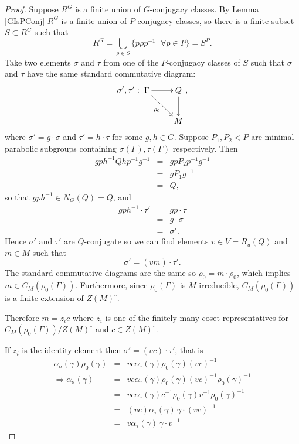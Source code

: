 \begin{proof}
	Suppose $R^G$ is a finite union of $G$-conjugacy classes. By Lemma \ref{GIsPConj} $R^G$ is a finite union of $P$-conjugacy classes, so there is a finite subset $S\subset R^G$ such that
	\begin{displaymath}
		R^G = \bigcup_{\rho \in S}\{p\rho p^{-1}\,|\,\forall p\in P\} = S^P.
	\end{displaymath}
	Take two elements $\sigma$ and $\tau$ from one of the $P$-conjugacy classes of $S$ such that $\sigma$ and $\tau$ have the same standard commutative diagram:
	\begin{displaymath}
		\sigma',\tau':\xymatrix{
			\Gamma \ar[r] \ar[rd]_{\rho_0} & Q \ar[d]\\
		& M},
	\end{displaymath}
	where $\sigma' = g\cdot\sigma$ and $\tau' = h\cdot\tau$ for some $g, h\in G$. Suppose $P_1,P_2<P$ are minimal parabolic subgroups containing $\sigma(\Gamma), \tau(\Gamma)$ respectively. Then
	\begin{eqnarray*}
		gph^{-1}Qhp^{-1}g^{-1} &=& gpP_2p^{-1}g^{-1} \\
		&=& gP_1g^{-1} \\
		&=& Q,
	\end{eqnarray*}
	so that $gph^{-1}\in N_G(Q) = Q$, and
	\begin{eqnarray*}
		gph^{-1}\cdot\tau' &=& gp\cdot \tau \\
		&=& g\cdot \sigma \\
		&=& \sigma'.
	\end{eqnarray*}
	Hence $\sigma'$ and $\tau'$ are $Q$-conjugate so we can find elements $v\in V = R_u(Q)$ and $m\in M$ such that
	\begin{displaymath}
		\sigma' = (vm)\cdot\tau'.
	\end{displaymath}
	The standard commutative diagrams are the same so $\rho_0 = m\cdot\rho_0$, which implies $m\in C_M(\rho_0(\Gamma))$. Furthermore, since $\rho_0(\Gamma)$ is $M$-irreducible, $C_M(\rho_0(\Gamma))$ is a finite extension of $Z(M)^\circ$.
	
	Therefore $m = z_ic$ where $z_i$ is one of the finitely many coset representatives for $C_M(\rho_0(\Gamma))/Z(M)^\circ$ and $c\in Z(M)^\circ$.
	
	If $z_i$ is the identity element then $\sigma' = (vc)\cdot\tau'$, that is
	\begin{eqnarray*}
		\alpha_\sigma(\gamma)\rho_0(\gamma) &=& vc\alpha_\tau(\gamma)\rho_0(\gamma)(vc)^{-1} \\
		\Rightarrow \alpha_\sigma(\gamma) &=& vc\alpha_\tau(\gamma)\rho_0(\gamma)(vc)^{-1}\rho_0(\gamma)^{-1} \\
		&=& vc\alpha_\tau(\gamma)c^{-1}\rho_0(\gamma)v^{-1}\rho_0(\gamma)^{-1} \\
		&=& (vc)\alpha_\tau(\gamma)\, \gamma\cdot(vc)^{-1} \\
		&=& v\alpha_\tau(\gamma)\, \gamma\cdot v^{-1}
	\end{eqnarray*}
		
\end{proof}



